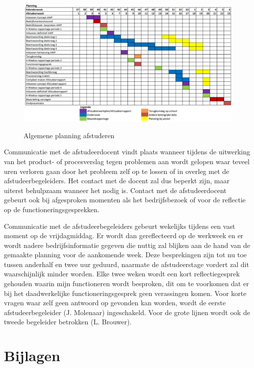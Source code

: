 \documentclass[10pt,a4paper,twoside]{report}
\begin{document}
\begin{figure}[!ht]
    \centering
    \includegraphics[angle=0,width=\textwidth]{planning}
    \label{fig:planning}
    \caption{Algemene planning afstuderen}
\end{figure}

Communicatie met de afstudeerdocent vindt plaats wanneer tijdens de uitwerking van het product- of procesverslag tegen problemen aan wordt gelopen waar teveel uren verloren gaan door het probleem zelf op te lossen of in overleg met de afstudeerbegeleiders. Het contact met de docent zal dus beperkt zijn, maar uiterst behulpzaam wanneer het nodig is. Contact met de afstudeerdocent gebeurt ook bij afgesproken momenten als het bedrijfsbezoek of voor de reflectie op de functioneringsgesprekken.

Communicatie met de afstudeerbegeleiders gebeurt wekelijks tijdens een vast moment op de vrijdagmiddag. Er wordt dan gereflecteerd op de werkweek en er wordt nadere bedrijfsinformatie gegeven die nuttig zal blijken aan de hand van de gemaakte planning voor de aankomende week. Deze besprekingen zijn tot nu toe tussen anderhalf en twee uur geduurd, naarmate de afstudeerstage vordert zal dit waarschijnlijk minder worden. Elke twee weken wordt een kort reflectiegesprek gehouden waarin mijn functioneren wordt besproken, dit om te voorkomen dat er bij het daadwerkelijke functioneringsgesprek geen verassingen komen. Voor korte vragen waar zelf geen antwoord op gevonden kan worden, wordt de eerste afstudeerbegeleider (J. Molenaar) ingeschakeld. Voor de grote lijnen wordt ook de tweede begeleider betrokken (L. Brouwer).

\printbibliography
{}

\newpage
\section*{Bijlagen}
\end{document}
